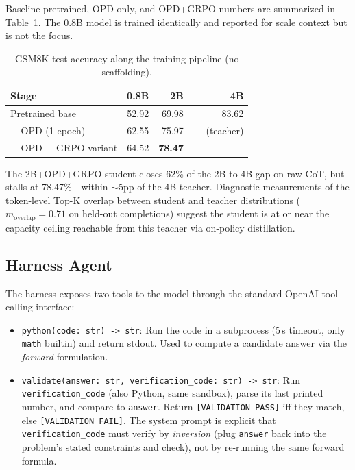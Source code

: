 \documentclass[10pt]{article}
\begin{document}
Baseline pretrained, OPD-only, and OPD+GRPO numbers are summarized in Table~\ref{tab:pipeline}. The 0.8B model is trained identically and reported for scale context but is not the focus.

\begin{table}[t]
\centering
\caption{GSM8K test accuracy along the training pipeline (no scaffolding).}
\label{tab:pipeline}
\begin{tabular}{lrrr}
\toprule
Stage & 0.8B & 2B & 4B \\
\midrule
Pretrained base & 52.92 & 69.98 & 83.62 \\
+ OPD (1 epoch) & 62.55 & 75.97 & --- (teacher) \\
+ OPD + GRPO variant & 64.52 & \textbf{78.47} & --- \\
\bottomrule
\end{tabular}
\end{table}

The 2B+OPD+GRPO student closes 62\% of the 2B-to-4B gap on raw CoT, but stalls at 78.47\%---within $\sim$5pp of the 4B teacher. Diagnostic measurements of the token-level Top-K overlap between student and teacher distributions ($m_{\text{overlap}} = 0.71$ on held-out completions) suggest the student is at or near the capacity ceiling reachable from this teacher via on-policy distillation.

\subsection{Harness Agent}

The harness exposes two tools to the model through the standard OpenAI tool-calling interface:
\begin{itemize}
  \item \texttt{python(code: str) -> str}: Run the code in a subprocess (5\,s timeout, only \texttt{math} builtin) and return stdout. Used to compute a candidate answer via the \emph{forward} formulation.
  \item \texttt{validate(answer: str, verification\_code: str) -> str}: Run \texttt{verification\_code} (also Python, same sandbox), parse its last printed number, and compare to \texttt{answer}. Return \texttt{[VALIDATION PASS]} iff they match, else \texttt{[VALIDATION FAIL]}. The system prompt is explicit that \texttt{verification\_code} must verify by \emph{inversion} (plug \texttt{answer} back into the problem's stated constraints and check), not by re-running the same forward formula.
\end{itemize}
\end{document}

